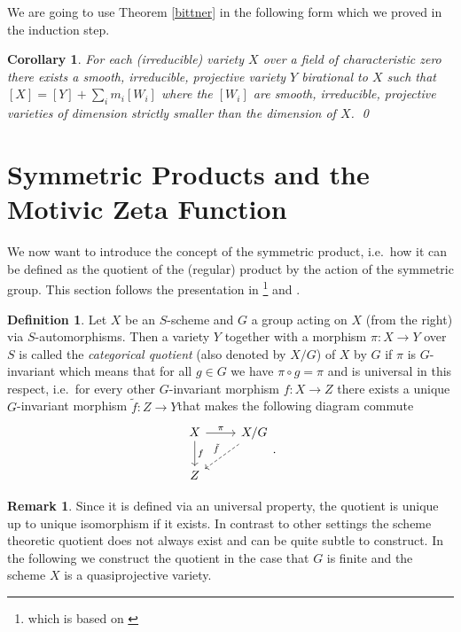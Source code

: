 \documentclass[11pt, a4paper, german, twoside]{article}
\theoremstyle{plain}
\newtheorem{corollary}[theorem]{Corollary}
\theoremstyle{definition}
\newtheorem{definition}[theorem]{Definition}
\newtheorem{remark}[theorem]{Remark}
\begin{document}
We are going to use Theorem \ref{bittner} in the following form which we proved in the induction step.

\begin{corollary}
    \label{decomp}
    For each (irreducible) variety $X$ over a field of characteristic zero there exists a smooth, irreducible, projective variety $Y$ birational
    to $X$ such that $[X] = [Y] + \sum_i m_i[W_i]$ where the $[W_i]$ are smooth, irreducible, projective varieties of dimension strictly
    smaller than the dimension of $X$. \qed
\end{corollary}



\section{Symmetric Products and the Motivic Zeta Function}
\label{symProd}
We now want to introduce the concept of the symmetric product, i.e.\ how it can be defined as the quotient of the (regular) product by the
action of the symmetric group. This section follows the presentation in \cite[Appendix A]{mustata}\footnote{which is based on \cite[§7]{MumAV}}
and \cite[Lecture 10]{harris}.
\begin{definition}
    Let $X$ be an $S$-scheme and $G$ a group acting on $X$ (from the right) 
    via $S$-automorphisms. Then a variety $Y$ together with a morphism $\pi \colon X \to Y$
    over $S$ is called the 
    \emph{categorical quotient} (also denoted by $X/G$) of $X$ by $G$ if $\pi$ is $G$-invariant which means that for all $g \in G$ we have
    $\pi \circ g = \pi$ and is universal in this respect, i.e.\ for every other $G$-invariant morphism $f \colon X \to Z$ there exists a unique
    $G$-invariant morphism $\tilde{f} \colon Z \to Y$that makes the following diagram commute
    \begin{equation*}
        \begin{tikzcd}
            X \arrow{r}{\pi} \arrow{d}{f} & X/G \\
            Z \arrow[dashleftarrow]{ur}{\tilde{f}}
        \end{tikzcd}.
    \end{equation*}
\end{definition}

\begin{remark}
    Since it is defined via an universal property, the quotient is unique up to unique isomorphism if it exists. 
    In contrast to other settings the scheme theoretic quotient does not always exist and can be quite subtle to construct.
    In the following we construct the quotient in the case that $G$ is finite and the scheme $X$ is a quasiprojective variety.
\end{remark}
\end{document}
